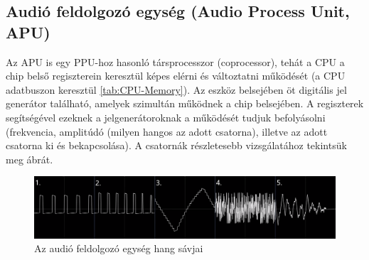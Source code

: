 	\subsection{Audió feldolgozó egység (Audio Process Unit, APU)}
	
	Az APU is egy PPU-hoz hasonló társprocesszor (coprocessor), tehát a CPU a chip belső regiszterein keresztül képes elérni és változtatni működését (a CPU adatbuszon keresztül \ref{tab:CPU-Memory}). Az eszköz belsejében öt digitális jel generátor található, amelyek szimultán működnek a chip belsejében. A regiszterek segítségével ezeknek a jelgenerátoroknak a működését tudjuk befolyásolni (frekvencia, amplitúdó (milyen hangos az adott csatorna), illetve az adott csatorna ki és bekapcsolása). A csatornák részletesebb vizsgálatához tekintsük meg  ábrát.
	
	\begin{figure}[H]
		\centering
		\includegraphics[width=150mm, keepaspectratio]{figures/APU-sound-channel-num}
		\caption{Az audió feldolgozó egység hang sávjai}
		\label{fig:APU-5-sound-channel}
	\end{figure} 
	
